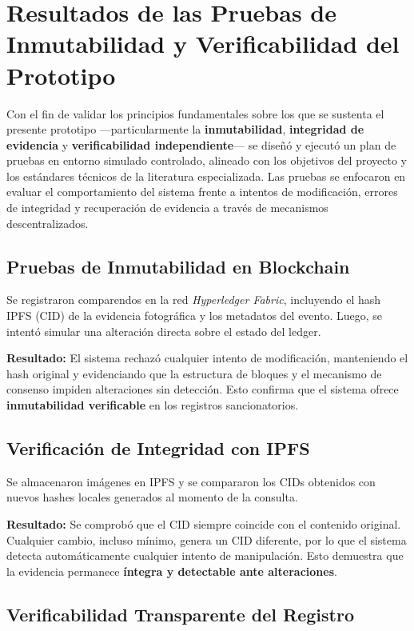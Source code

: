 \section{Resultados de las Pruebas de Inmutabilidad y Verificabilidad del Prototipo}

Con el fin de validar los principios fundamentales sobre los que se sustenta el presente prototipo —particularmente la \textbf{inmutabilidad}, \textbf{integridad de evidencia} y \textbf{verificabilidad independiente}— se diseñó y ejecutó un plan de pruebas en entorno simulado controlado, alineado con los objetivos del proyecto y los estándares técnicos de la literatura especializada. Las pruebas se enfocaron en evaluar el comportamiento del sistema frente a intentos de modificación, errores de integridad y recuperación de evidencia a través de mecanismos descentralizados.

\subsection{Pruebas de Inmutabilidad en Blockchain}

Se registraron comparendos en la red \textit{Hyperledger Fabric}, incluyendo el hash IPFS (CID) de la evidencia fotográfica y los metadatos del evento. Luego, se intentó simular una alteración directa sobre el estado del ledger.

\textbf{Resultado:} El sistema rechazó cualquier intento de modificación, manteniendo el hash original y evidenciando que la estructura de bloques y el mecanismo de consenso impiden alteraciones sin detección. Esto confirma que el sistema ofrece \textbf{inmutabilidad verificable} en los registros sancionatorios.

\subsection{Verificación de Integridad con IPFS}

Se almacenaron imágenes en IPFS y se compararon los CIDs obtenidos con nuevos hashes locales generados al momento de la consulta.

\textbf{Resultado:} Se comprobó que el CID siempre coincide con el contenido original. Cualquier cambio, incluso mínimo, genera un CID diferente, por lo que el sistema detecta automáticamente cualquier intento de manipulación. Esto demuestra que la evidencia permanece \textbf{íntegra y detectable ante alteraciones}.

\subsection{Verificabilidad Transparente del Registro}


